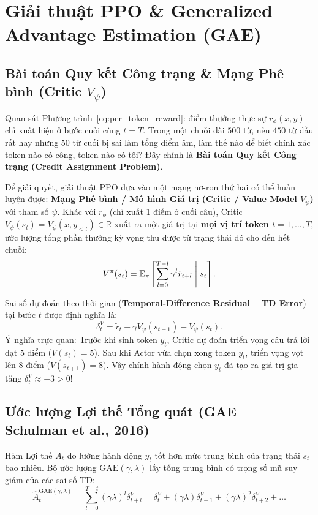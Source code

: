 \section{Giải thuật PPO \& Generalized Advantage Estimation (GAE)}
\label{sec:ppo_gae}

\subsection{Bài toán Quy kết Công trạng \& Mạng Phê bình (Critic $V_\psi$)}
Quan sát Phương trình~\eqref{eq:per_token_reward}: điểm thưởng thực sự $r_\phi(x, y)$ chỉ xuất hiện ở bước cuối cùng $t = T$. Trong một chuỗi dài $500$ từ, nếu $450$ từ đầu rất hay nhưng $50$ từ cuối bị sai làm tổng điểm âm, làm thế nào để biết chính xác token nào có công, token nào có tội? Đây chính là \textbf{Bài toán Quy kết Công trạng (Credit Assignment Problem)}.

Để giải quyết, giải thuật PPO đưa vào một mạng nơ-ron thứ hai có thể huấn luyện được: \textbf{Mạng Phê bình / Mô hình Giá trị (Critic / Value Model $V_\psi$)} với tham số $\psi$.
Khác với $r_\phi$ (chỉ xuất 1 điểm ở cuối câu), Critic $V_\psi(s_t) = V_\psi(x, y_{<t}) \in \mathbb{R}$ xuất ra một giá trị tại \textbf{mọi vị trí token $t = 1, \dots, T$}, ước lượng tổng phần thưởng kỳ vọng thu được từ trạng thái đó cho đến hết chuỗi:
\begin{equation}
    V^\pi(s_t) = \operatorname{\mathbb{E}}_{\pi} \left[ \sum_{l=0}^{T-t} \gamma^l \tilde{r}_{t+l} \;\middle|\; s_t \right].
\end{equation}

Sai số dự đoán theo thời gian (\textbf{Temporal-Difference Residual -- TD Error}) tại bước $t$ được định nghĩa là:
\begin{equation}
    \delta_t^V = \tilde{r}_t + \gamma V_\psi(s_{t+1}) - V_\psi(s_t).
    \label{eq:td_error}
\end{equation}
Ý nghĩa trực quan: Trước khi sinh token $y_t$, Critic dự đoán triển vọng câu trả lời đạt $5$ điểm ($V(s_t) = 5$). Sau khi Actor vừa chọn xong token $y_t$, triển vọng vọt lên $8$ điểm ($V(s_{t+1}) = 8$). Vậy chính hành động chọn $y_t$ đã tạo ra giá trị gia tăng $\delta_t^V \approx +3 > 0$!

\subsection{Ước lượng Lợi thế Tổng quát (GAE -- Schulman et al., 2016)}
\begin{definition}
Hàm Lợi thế $A_t$ đo lường hành động $y_t$ tốt hơn mức trung bình của trạng thái $s_t$ bao nhiêu. Bộ ước lượng $\text{GAE}(\gamma, \lambda)$ lấy tổng trung bình có trọng số mũ suy giảm của các sai số TD:
\begin{equation}
    \hat{A}_t^{\text{GAE}(\gamma, \lambda)} = \sum_{l=0}^{T-t} (\gamma \lambda)^l \delta_{t+l}^V = \delta_t^V + (\gamma \lambda) \delta_{t+1}^V + (\gamma \lambda)^2 \delta_{t+2}^V + \dots
    \label{eq:gae_formula}
\end{equation}
\end{definition}

